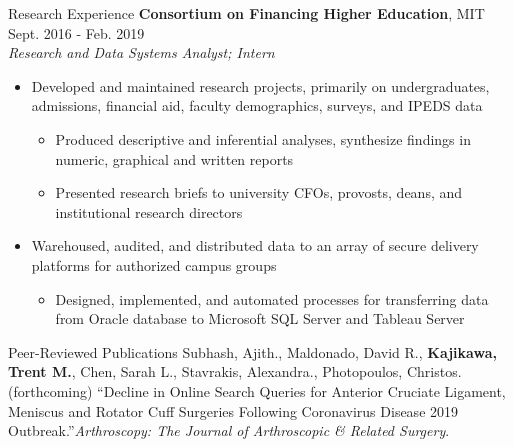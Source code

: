 \documentclass{resume} %
\begin{document}
\begin{rSection}{Research Experience}
{\bf Consortium on Financing Higher Education}{, MIT} \hfill {Sept. 2016 - Feb. 2019}\\
{\em Research and Data Systems Analyst; Intern}
\begin{itemize}[noitemsep]
    \item Developed and maintained research projects, primarily on undergraduates,
    admissions, financial aid, faculty demographics, surveys, and IPEDS data
    \begin{itemize}[noitemsep]
        \item Produced descriptive and inferential analyses, synthesize findings in
        numeric, graphical and written reports
       \item Presented research briefs to university CFOs, provosts, deans, and institutional research directors
    \end{itemize}
    \item Warehoused, audited, and distributed data to an array of secure delivery platforms for authorized campus groups
    \begin{itemize}[noitemsep]
        \item Designed, implemented, and automated processes for transferring data 
        from Oracle database to Microsoft SQL Server and Tableau Server
    \end{itemize}
    \end{itemize}

    \end{rSection}

\begin{rSection}{Peer-Reviewed Publications}
{Subhash, Ajith., Maldonado, David R., \textbf{Kajikawa, Trent M.}, Chen, Sarah L., Stavrakis, Alexandra., Photopoulos, Christos. (forthcoming) ``Decline in Online Search Queries for Anterior Cruciate Ligament, Meniscus and
Rotator Cuff Surgeries Following Coronavirus Disease 2019 Outbreak.''\emph{Arthroscopy: The Journal of Arthroscopic \& Related Surgery}.}

    \end{rSection}
\end{document}
